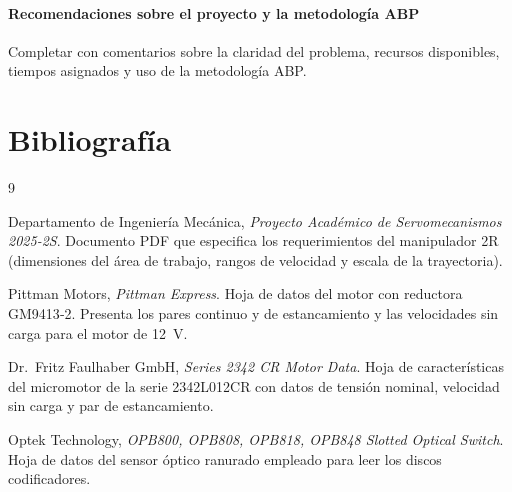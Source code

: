 \documentclass[11pt,a4paper]{article}
\begin{document}
\paragraph{Recomendaciones sobre el proyecto y la metodología ABP}
Completar con comentarios sobre la claridad del problema, recursos
disponibles, tiempos asignados y uso de la metodología ABP.

\section*{Bibliografía}
\begin{thebibliography}{9}

Departamento de Ingeniería Mecánica, \emph{Proyecto Académico de Servomecanismos 2025‑2S}.  Documento PDF que especifica los requerimientos del manipulador 2R (dimensiones del área de trabajo, rangos de velocidad y escala de la trayectoria).

Pittman Motors, \emph{Pittman Express}.  Hoja de datos del motor con reductora GM9413‑2.  Presenta los pares continuo y de estancamiento y las velocidades sin carga para el motor de \SI{12}{\volt}.

Dr.~Fritz Faulhaber GmbH, \emph{Series 2342 CR Motor Data}.  Hoja de características del micromotor de la serie 2342L012CR con datos de tensión nominal, velocidad sin carga y par de estancamiento.

Optek Technology, \emph{OPB800, OPB808, OPB818, OPB848 Slotted Optical Switch}.  Hoja de datos del sensor óptico ranurado empleado para leer los discos codificadores.

\end{thebibliography}
\end{document}
